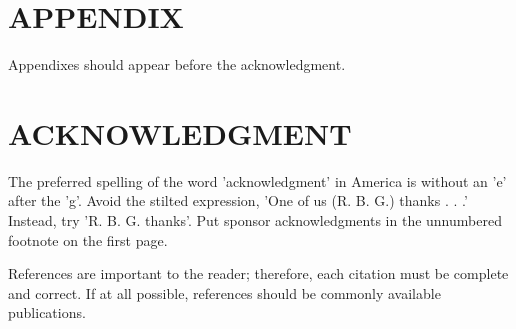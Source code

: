 \documentclass[letterpaper, 10 pt, conference]{ieeeconf}  %
\begin{document}
\section*{APPENDIX}

Appendixes should appear before the acknowledgment.

\section*{ACKNOWLEDGMENT}

The preferred spelling of the word 'acknowledgment' in America is without an 'e' after the 'g'. Avoid the stilted expression, 'One of us (R. B. G.) thanks . . .'  Instead, try 'R. B. G. thanks'. Put sponsor acknowledgments in the unnumbered footnote on the first page.




References are important to the reader; therefore, each citation must be complete and correct. If at all possible, references should be commonly available publications.
\end{document}
